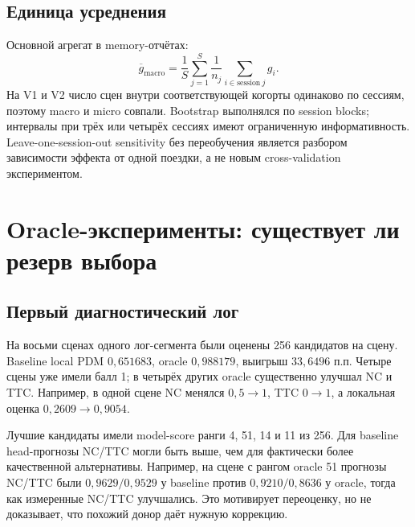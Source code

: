 \documentclass[11pt,a4paper]{article}
\begin{document}
\subsection{Единица усреднения}
Основной агрегат в memory-отчётах:
\begin{equation}
 \overline g_{\mathrm{macro}}=\frac{1}{S}\sum_{j=1}^{S}
 \frac{1}{n_j}\sum_{i\in\mathrm{session}\ j}g_i.
\end{equation}
На V1 и V2 число сцен внутри соответствующей когорты одинаково по сессиям, поэтому macro и micro совпали. Bootstrap выполнялся по session blocks; интервалы при трёх или четырёх сессиях имеют ограниченную информативность. Leave-one-session-out sensitivity без переобучения является разбором зависимости эффекта от одной поездки, а не новым cross-validation экспериментом.

\section{Oracle-эксперименты: существует ли резерв выбора}
\subsection{Первый диагностический лог}
На восьми сценах одного лог-сегмента были оценены 256 кандидатов на сцену. Baseline local PDM $0{,}651683$, oracle $0{,}988179$, выигрыш $33{,}6496$ п.п. Четыре сцены уже имели балл 1; в четырёх других oracle существенно улучшал NC и TTC. Например, в одной сцене NC менялся $0{,}5\rightarrow1$, TTC $0\rightarrow1$, а локальная оценка $0{,}2609\rightarrow0{,}9054$.

Лучшие кандидаты имели model-score ранги 4, 51, 14 и 11 из 256. Для baseline head-прогнозы NC/TTC могли быть выше, чем для фактически более качественной альтернативы. Например, на сцене с рангом oracle 51 прогнозы NC/TTC были $0{,}9629/0{,}9529$ у baseline против $0{,}9210/0{,}8636$ у oracle, тогда как измеренные NC/TTC улучшались. Это мотивирует переоценку, но не доказывает, что похожий донор даёт нужную коррекцию.
\end{document}
